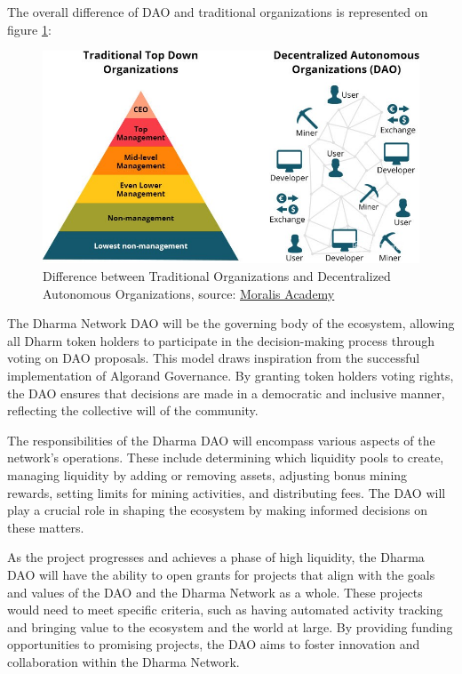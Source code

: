 The overall difference of DAO and traditional organizations is represented on figure \ref{fig:dao}:

    \begin{figure}[htbp]
	   \centering
	   \includegraphics[scale=0.4]{figures/dao.png}  %
	   \caption{Difference between Traditional Organizations and Decentralized Autonomous Organizations, source: \href{https://academy.moralis.io/blockchain-guides/beginners-guide-how-to-create-a-dao}{Moralis Academy}}
	   \label{fig:dao}
    \end{figure}

The Dharma Network DAO will be the governing body of the ecosystem, allowing all Dharm token holders to participate in the decision-making process through voting on DAO proposals. This model draws inspiration from the successful implementation of Algorand Governance. By granting token holders voting rights, the DAO ensures that decisions are made in a democratic and inclusive manner, reflecting the collective will of the community.\newline

The responsibilities of the Dharma DAO will encompass various aspects of the network's operations. These include determining which liquidity pools to create, managing liquidity by adding or removing assets, adjusting bonus mining rewards, setting limits for mining activities, and distributing fees. The DAO will play a crucial role in shaping the ecosystem by making informed decisions on these matters.\newline

As the project progresses and achieves a phase of high liquidity, the Dharma DAO will have the ability to open grants for projects that align with the goals and values of the DAO and the Dharma Network as a whole. These projects would need to meet specific criteria, such as having automated activity tracking and bringing value to the ecosystem and the world at large. By providing funding opportunities to promising projects, the DAO aims to foster innovation and collaboration within the Dharma Network.\newline

